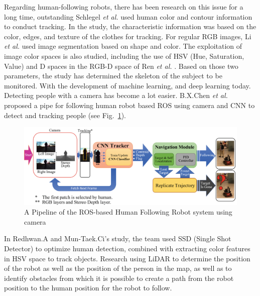 Regarding human-following robots, there has been research on this issue for a long time, outstanding Schlegel {\it et al.} \cite{visionbased} used human color and contour information to conduct tracking. In the study, the characteristic information was based on the color, edges, and texture of the clothes for tracking. For regular RGB images, Li {\it et al.} \cite{detectionbasedcolor} used image segmentation based on shape and color. The exploitation of image color spaces is also studied, including the use of HSV (Hue, Saturation, Value) and D spaces in the RGB-D space of Ren {\it et al.} \cite{realtimetarget}. Based on those two parameters, the study has determined the skeleton of the subject to be monitored. With the development of machine learning, and deep learning today. Detecting people with a camera has become a lot easier. B.X.Chen {\it et al.} \cite{refchap2-fig1} proposed a pipe for following human robot based ROS using camera and CNN to detect and tracking people (see Fig.~\ref{Chap2:Fig1}).\\ 

\begin{figure}[h]
    \centering
    \includegraphics[width=1.0\linewidth]{figures/chap2_fig/pipeline_cnn.png}
    \caption{A Pipeline of the ROS-based Human Following Robot system using camera\cite{refchap2-fig1}}
    \label{Chap2:Fig1}
\end{figure}

In Redhwan.A and Mun-Taek.Ci's study\cite{DL_Color_feature}, the team used SSD (Single Shot Detector) to optimize human detection, combined with extracting color features in HSV space to track objects. Research using LiDAR  to determine the position of the robot as well as the position of the person in the map, as well as to identify obstacles from which it is possible to create a path from the robot position to the human position for the robot to follow.\\

